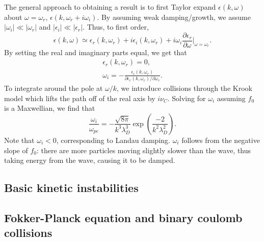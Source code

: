 	The general approach to obtaining a result is to first Taylor expand $\epsilon(k,\omega)$ about $\omega=\omega_r$, $\epsilon(k,\omega_r+i\omega_i)$. By assuming weak damping/growth, we assume $|\omega_i|\ll|\omega_r|$ and $|\epsilon_i|\ll|\epsilon_r|$. Thus, to first order, 
	\begin{equation}
	\epsilon(k,\omega) \simeq \epsilon_r(k,\omega_r) + i\epsilon_i(k,\omega_r) + i\omega_i\frac{\partial\epsilon_r}{\partial\omega}\big|_{\omega=\omega_r}.
	\end{equation}
	By setting the real and imaginary parts equal, we get that
	\begin{align}
	\epsilon_r(k,\omega_r) = 0, \\
	\omega_i = -\frac{\epsilon_i(k,\omega_r)}{\partial\epsilon_r(k,\omega_r)/\partial\omega_r}.
	\end{align}
	To integrate around the pole at $\omega/k$, we introduce collisions through the Krook model which lifts the path off of the real axis by $i\nu_C$. Solving for $\omega_i$ assuming $f_0$ is a Maxwellian, we find that
	\begin{equation}
	\frac{\omega_i}{\omega_{pe}} = -\frac{\sqrt{8\pi}}{k^3\lambda_D^3}\exp{\left(\frac{-2}{k^2\lambda_D^2}\right)}.
	\end{equation}
	Note that $\omega_i<0$, corresponding to Landau damping. $\omega_i$ follows from the negative slope of $f_0$: there are more particles moving slightly slower than the wave, thus taking energy from the wave, causing it to be damped. 

	\subsection{Basic kinetic instabilities}
	\subsection{Fokker-Planck equation and binary coulomb collisions}

